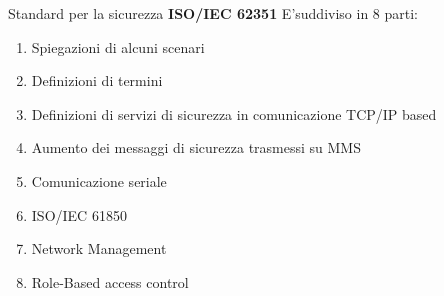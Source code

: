 \begin{frame}{Standard per la sicurezza}
	\textbf{ISO/IEC 62351}
	\newline
	E'suddiviso in 8 parti:
	\begin{enumerate}[<+- | alert@+>]
		\item Spiegazioni di alcuni scenari
		\item Definizioni di termini
		\item Definizioni di servizi di sicurezza in comunicazione TCP/IP based
		\item Aumento dei messaggi di sicurezza trasmessi su MMS
		\item Comunicazione seriale
		\item ISO/IEC 61850 %
		\item Network Management%
		\item Role-Based access control
	\end{enumerate}
\end{frame}